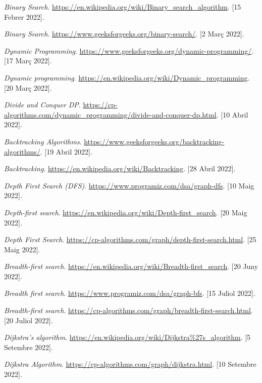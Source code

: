 \begin{thewebography}{9}
\bibitem{}
    \emph{Binary Search}.
    \url{https://en.wikipedia.org/wiki/Binary_search_algorithm}.
    [15 Febrer 2022].

\bibitem{}
    \emph{Binary Search}.
    \url{https://www.geeksforgeeks.org/binary-search/}.
    [2 Març 2022].
    
    
    
\bibitem{}
    \emph{Dynamic Programming}.
    \url{https://www.geeksforgeeks.org/dynamic-programming/}.
    [17 Març 2022].

\bibitem{}
    \emph{Dynamic programming}.
    \url{https://en.wikipedia.org/wiki/Dynamic_programming}.
    [20 Març 2022].

\bibitem{}
    \emph{Divide and Conquer DP}.
    \url{https://cp-algorithms.com/dynamic_programming/divide-and-conquer-dp.html}.
    [10 Abril 2022].
    
    
    

\bibitem{}
    \emph{Backtracking Algorithms}.
    \url{https://www.geeksforgeeks.org/backtracking-algorithms/}.
    [19 Abril 2022].

\bibitem{}
    \emph{Backtracking}.
    \url{https://en.wikipedia.org/wiki/Backtracking}.
    [28 Abril 2022].
    
    

\bibitem{}
    \emph{Depth First Search (DFS)}.
    \url{https://www.programiz.com/dsa/graph-dfs}.
    [10 Maig 2022].

\bibitem{}
    \emph{Depth-first search}.
    \url{https://en.wikipedia.org/wiki/Depth-first_search}.
    [20 Maig 2022].


\bibitem{}
    \emph{Depth First Search}.
    \url{https://cp-algorithms.com/graph/depth-first-search.html}.
    [25 Maig 2022].
    
    

\bibitem{}
    \emph{Breadth-first search}.
    \url{https://en.wikipedia.org/wiki/Breadth-first_search}.
    [20 Juny 2022].
    
\bibitem{}
    \emph{Breadth first search}.
    \url{https://www.programiz.com/dsa/graph-bfs}.
    [15 Juliol 2022].
    
\bibitem{}
    \emph{Breadth-first search}.
    \url{https://cp-algorithms.com/graph/breadth-first-search.html}.
    [20 Juliol 2022].



\bibitem{}
    \emph{Dijkstra's algorithm}.
    \url{https://en.wikipedia.org/wiki/Dijkstra%27s_algorithm}.
    [5 Setembre 2022].

\bibitem{}
    \emph{Dijkstra Algorithm}.
    \url{https://cp-algorithms.com/graph/dijkstra.html}.
    [10 Setembre 2022].

    
\end{thewebography}